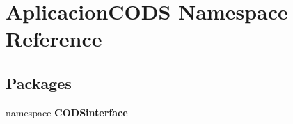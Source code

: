\section{\-Aplicacion\-C\-O\-D\-S \-Namespace \-Reference}
\label{namespace_aplicacion_c_o_d_s}
\subsection*{\-Packages}
\begin{DoxyCompactItemize}
\item 
namespace {\bf \-C\-O\-D\-Sinterface}
\end{DoxyCompactItemize}
